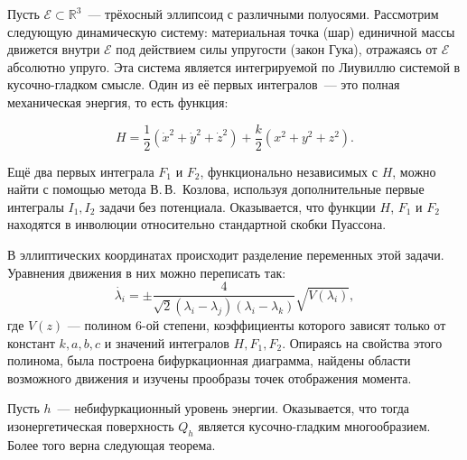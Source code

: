 



\vzmscaption



	Пусть $\mathcal{E}\subset \mathbb{R}^3$~--- трёхосный эллипсоид с различными полуосями. Рассмотрим следующую динамическую систему: материальная точка (шар) единичной массы движется внутри $\mathcal{E}$ под действием силы упругости (закон Гука), отражаясь от $\mathcal{E}$ абсолютно упруго.  Эта система является интегрируемой по Лиувиллю системой в кусочно-гладком смысле. Один из её первых интегралов~--- это  полная механическая энер\-гия, то есть функция:

	\[
	H=\dfrac{1}{2}(\dot{x}^2+\dot{y}^2+\dot{z}^2)+\dfrac{k}{2}(x^2+y^2+z^2).
	\]

	Ещё два первых интеграла $F_1$ и $F_2$, функционально независимых с $H$, можно найти с помощью метода В.\,В.~Козлова, используя дополнительные первые ин\-те\-гра\-лы $I_1, I_2$ задачи без потенциала. Оказывается, что функции $H$, $F_1$ и $F_2$ находятся в инволюции относительно стандартной скобки Пуассона.

	В эллиптических координатах происходит разделение переменных этой задачи. Уравнения движения в них можно переписать так:
	\[
	\dot{\lambda_i}=\pm\dfrac{4}{\sqrt{2}(\lambda_i-\lambda_j)(\lambda_i-\lambda_k)}\sqrt{V(\lambda_i)},
	\]
	где $V(z)$ --- полином 6-ой степени, коэффициенты которого зависят только от констант $k,a,b,c$ и значений интегралов $H,F_1,F_2$. Опираясь на свойства этого полинома, была построена бифуркационная диаграмма, найдены области возможного движения и изучены прообразы точек отображения момента.

	Пусть $h$~--- небифуркационный уровень энергии. Оказывается, что тогда изонергетическая поверхность $Q_h$ является кусочно-гладким многообразием. Более того верна следующая теорема.

